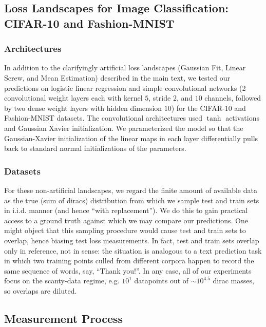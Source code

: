 \documentclass{article}
\theoremstyle{plain}
\theoremstyle{definition}
\begin{document}
    \subsection{Loss Landscapes for Image Classification: CIFAR-10 and Fashion-MNIST}
        \subsubsection*{Architectures}
            In addition to the clarifyingly artificial loss landscapes
            (Gaussian Fit, Linear Screw, and Mean Estimation) described in the
            main text, we tested our predictions on logistic linear regression
            and simple convolutional networks (2 convolutional weight layers
            each with kernel $5$, stride $2$, and $10$ channels, followed by
            two dense weight layers with hidden dimension $10$) for the
            CIFAR-10 and Fashion-MNIST datasets.  The convolutional
            architectures used $\tanh$ activations and Gaussian Xavier
            initialization.  We parameterized the model so that the
            Gaussian-Xavier initialization of the linear maps in each layer
            differentially pulls back to standard normal initializations of the
            parameters.
            
        \subsubsection*{Datasets}
            For these non-artificial landscapes, we regard the finite amount of
            available data as the true (sum of diracs) distribution from which
            we sample test and train sets in i.i.d.  manner (and hence ``with
            replacement'').  We do this to gain practical access to a ground
            truth against which we may compare our predictions.  One might
            object that this sampling procedure would cause test and train sets
            to overlap, hence biasing test loss measurements.  In fact, test
            and train sets overlap only in reference, not in sense: the
            situation is analogous to a text prediction task in which two
            training points culled from different corpora happen to record the
            same sequence of words, say, ``Thank you!''.  In any case, all of
            our experiments focus on the scanty-data regime, e.g. $10^1$
            datapoints out of $\sim 10^{4.5}$ dirac masses, so overlaps are
            diluted. 

    \subsection{Measurement Process}
\end{document}
